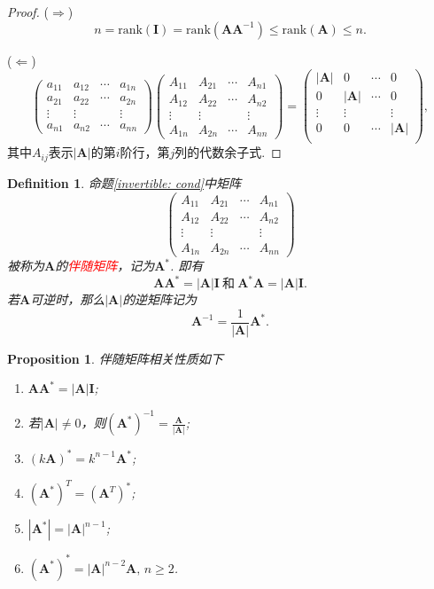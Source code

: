 \documentclass{article}
\newtheorem{proposition}[theorem]{Proposition}
\newtheorem{definition}[theorem]{Definition}
\newcommand{\mbf}[1]{\bm{#1}}
\newcommand{\rank}[1]{\text{rank}\left(#1\right)} %
\newcommand{\redt}[1]{\textcolor{red}{#1}}
\begin{document}
\begin{proof}
($\Rightarrow$)
$$
n =\rank{\mbf{I}} = \rank{\mbf{A}\mbf{A}^{-1}} \leq \rank{\mbf{A}} \leq n.
$$

($\Leftarrow$)
$$
\begin{pmatrix}
a_{11} & a_{12} & \cdots & a_{1n} \\
a_{21} & a_{22} & \cdots & a_{2n} \\
\vdots & \vdots &&\vdots \\
a_{n1} & a_{n2} & \cdots & a_{nn}
\end{pmatrix}
\begin{pmatrix}
A_{11} & A_{21} & \cdots & A_{n1} \\
A_{12} & A_{22} & \cdots & A_{n2} \\
\vdots & \vdots &&\vdots \\
A_{1n} & A_{2n} & \cdots & A_{nn}
\end{pmatrix}
=\begin{pmatrix}
|\mbf{A}| & 0 & \cdots & 0\\
0 & |\mbf{A}| & \cdots & 0\\
\vdots & \vdots &  & \vdots\\
0 & 0 & \cdots & |\mbf{A}|\\
\end{pmatrix},
$$
其中$A_{ij}$表示$|\mbf{A}|$的第$i$阶行，第$j$列的代数余子式.
\end{proof}

\begin{definition}
\rm 命题\ref{invertible: cond}中矩阵
$$
\begin{pmatrix}
A_{11} & A_{21} & \cdots & A_{n1} \\
A_{12} & A_{22} & \cdots & A_{n2} \\
\vdots & \vdots &&\vdots \\
A_{1n} & A_{2n} & \cdots & A_{nn}
\end{pmatrix}
$$
被称为$\mbf{A}$的\redt{伴随矩阵}，记为$\mbf{A}^*$. 即有
$$
\mbf{A}\mbf{A}^* = |\mbf{A}|\mbf{I}~\text{和}~\mbf{A}^*\mbf{A} = |\mbf{A}|\mbf{I}.
$$
若$\mbf{A}$可逆时，那么$|\mbf{A}|$的逆矩阵记为
$$
\mbf{A}^{-1} = \frac{1}{|\mbf{A}|}\mbf{A}^*.
$$
\end{definition}

\begin{proposition}
\rm 伴随矩阵相关性质如下
\begin{enumerate}
	\item $\mbf{A}\mbf{A}^*=|\mbf{A}|\mbf{I}$;
	\item 若$|\mbf{A}| \neq 0$，则$(\mbf{A}^*)^{-1}=\frac{\mbf{A}}{|\mbf{A}|}$;
	\item $(k\mbf{A})^* = k^{n-1}\mbf{A}^*$;
	\item $(\mbf{A}^*)^T = (\mbf{A}^T)^*$;
	\item $|\mbf{A}^*|=|\mbf{A}|^{n-1}$;
	\item $(\mbf{A}^*)^* = |\mbf{A}|^{n-2}\mbf{A},\, n \geq 2$.
\end{enumerate}
\end{proposition}
\end{document}
